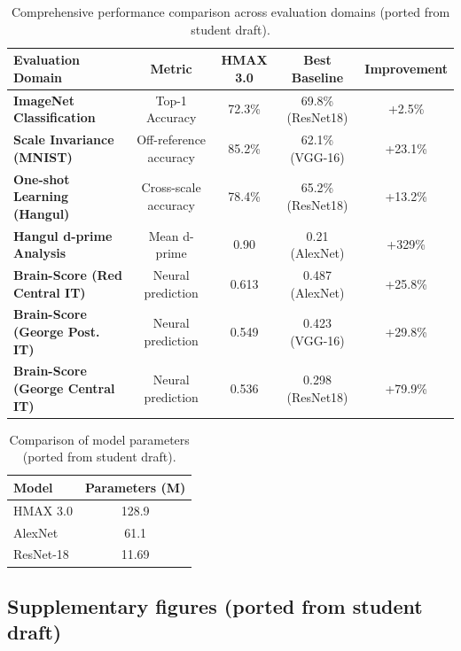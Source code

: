 \documentclass[pdflatex,sn-nature]{sn-jnl}
\begin{document}
\begin{table}[h]
\centering
\renewcommand{\arraystretch}{1.2}
\small
\begin{tabular}{|l|c|c|c|c|}
\hline
\textbf{Evaluation Domain} & \textbf{Metric} & \textbf{HMAX 3.0} & \textbf{Best Baseline} & \textbf{Improvement} \\
\hline
\textbf{ImageNet Classification} & Top-1 Accuracy & 72.3\% & 69.8\% (ResNet18) & +2.5\% \\
\hline
\textbf{Scale Invariance (MNIST)} & Off-reference accuracy & 85.2\% & 62.1\% (VGG-16) & +23.1\% \\
\hline
\textbf{One-shot Learning (Hangul)} & Cross-scale accuracy & 78.4\% & 65.2\% (ResNet18) & +13.2\% \\
\hline
\textbf{Hangul d-prime Analysis} & Mean d-prime & 0.90 & 0.21 (AlexNet) & +329\% \\
\hline
\textbf{Brain-Score (Red Central IT)} & Neural prediction & 0.613 & 0.487 (AlexNet) & +25.8\% \\
\hline
\textbf{Brain-Score (George Post. IT)} & Neural prediction & 0.549 & 0.423 (VGG-16) & +29.8\% \\
\hline
\textbf{Brain-Score (George Central IT)} & Neural prediction & 0.536 & 0.298 (ResNet18) & +79.9\% \\
\hline
\end{tabular}
\caption{Comprehensive performance comparison across evaluation domains (ported from student draft).}
\label{tab:sup_comprehensive_results}
\end{table}

\begin{table}[h]
\centering
\renewcommand{\arraystretch}{1.2}
\small
\begin{tabular}{|l|c|}
\hline
\textbf{Model} & \textbf{Parameters (M)} \\
\hline
HMAX 3.0 & 128.9 \\
AlexNet & 61.1 \\
ResNet-18 & 11.69 \\
\hline
\end{tabular}
\caption{Comparison of model parameters (ported from student draft).}
\label{tab:sup_model_parameters}
\end{table}

\subsection{Supplementary figures (ported from student draft)}
\end{document}
